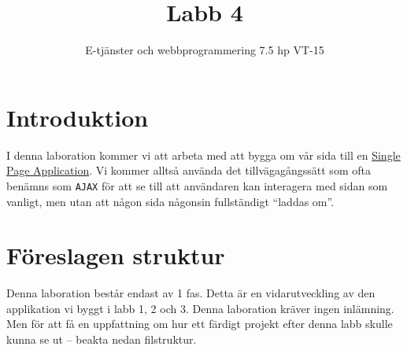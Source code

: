 \documentclass[12pt]{article}
\date{}
\title{ Labb 4 }
\author{ E-tjänster och webbprogrammering 7.5 hp VT-15 }
\begin{document}
\maketitle
\vspace{-2em}



\section{Introduktion}
I denna laboration kommer vi att arbeta med att bygga om vår sida till en \href{http://en.wikipedia.org/wiki/Single-page_application}{Single Page Application}. Vi kommer alltså använda det tillvägagångssätt som ofta benämns som \texttt{AJAX} för att se till att användaren kan interagera med sidan som vanligt, men utan att någon sida någonsin fullständigt ``laddas om''.





\pagebreak
\section{Föreslagen struktur}
Denna laboration består endast av 1 fas. Detta är en vidarutveckling av den applikation vi byggt i labb 1, 2 och 3. Denna laboration kräver ingen inlämning. Men för att få en uppfattning om hur ett färdigt projekt efter denna labb skulle kunna se ut -- beakta nedan filstruktur.
\end{document}
